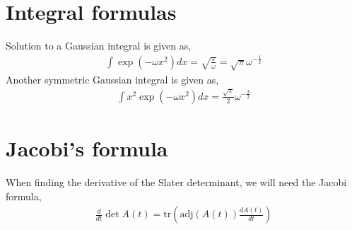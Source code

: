 \documentclass[11pt]{article}
\begin{document}
\begin{appendices}
	\section{Integral formulas}
	Solution to a Gaussian integral is given as,
	\begin{align}
		\int \exp\left( - \omega x^2 \right) d x = \sqrt{\frac{\pi}{\omega}} = \sqrt{\pi}\omega^{-\frac{1}{2}}
		\label{eq:gaussian-integral}
	\end{align}
	Another symmetric Gaussian integral is given as,
	\begin{align}
		\int x^2 \exp\left( - \omega x^2 \right) d x = \frac{\sqrt{\pi}}{2}\omega^{-\frac{3}{2}}
		\label{eq:gaussian-integral-x-squared}
	\end{align}
	
	\section{Jacobi's formula}
	When finding the derivative of the Slater determinant, we will need the Jacobi formula,
	\begin{align}
		\frac{d}{dt}\det A(t) = \mathrm{tr} \left( \mathrm{adj}(A(t))\frac{dA(t)}{dt} \right)
		\label{eq:jacobi-formula}
	\end{align}
\end{appendices}

{}
%

\end{document}

